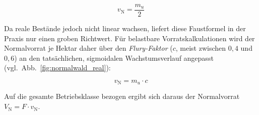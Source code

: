 \documentclass[twocolumn, paper=a4, fontsize=10pt]{scrartcl}
\begin{document}
\begin{equation}
  v_{\text{N}} = \frac{m_u}{2}
\end{equation}

Da reale Bestände jedoch nicht linear wachsen, liefert diese Faustformel in der Praxis nur einen groben Richtwert. Für belastbare Vorratskalkulationen wird der Normalvorrat je Hektar daher über den \emph{Flury-Faktor} ($c$, meist zwischen $0{,}4$ und $0{,}6$) an den tatsächlichen, sigmoidalen Wachstumsverlauf angepasst (vgl.\ Abb.~\ref{fig:normalwald_real}):

\begin{equation}
  \label{eq:flury_vn}
  v_{\text{N}} = m_u \cdot c
\end{equation}

Auf die gesamte Betriebsklasse bezogen ergibt sich daraus der Normalvorrat $V_{\text{N}} = F \cdot v_{\text{N}}$.
\end{document}
